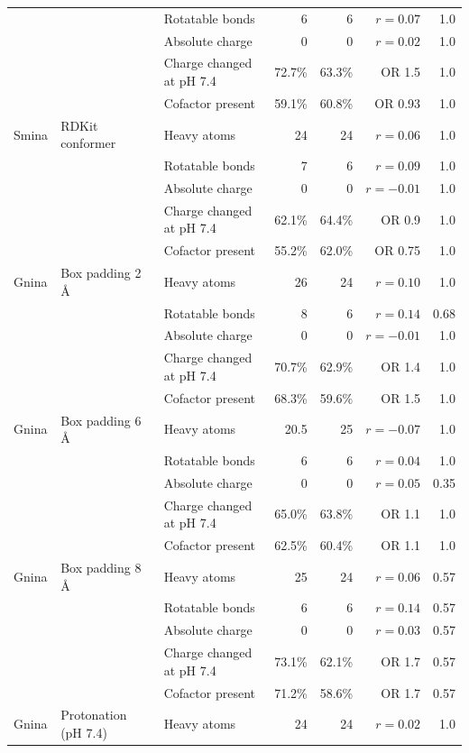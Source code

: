 \begin{longtable}{lllrrrr}
 &  & Rotatable bonds & 6 & 6 & $r = 0.07$ & 1.0 \\
 &  & Absolute charge & 0 & 0 & $r = 0.02$ & 1.0 \\
 &  & Charge changed at pH 7.4 & 72.7\% & 63.3\% & OR 1.5 & 1.0 \\
 &  & Cofactor present & 59.1\% & 60.8\% & OR 0.93 & 1.0 \\
\addlinespace
Smina & RDKit conformer & Heavy atoms & 24 & 24 & $r = 0.06$ & 1.0 \\
 &  & Rotatable bonds & 7 & 6 & $r = 0.09$ & 1.0 \\
 &  & Absolute charge & 0 & 0 & $r = -0.01$ & 1.0 \\
 &  & Charge changed at pH 7.4 & 62.1\% & 64.4\% & OR 0.9 & 1.0 \\
 &  & Cofactor present & 55.2\% & 62.0\% & OR 0.75 & 1.0 \\
\addlinespace
Gnina & Box padding 2 \AA{} & Heavy atoms & 26 & 24 & $r = 0.10$ & 1.0 \\
 &  & Rotatable bonds & 8 & 6 & $r = 0.14$ & 0.68 \\
 &  & Absolute charge & 0 & 0 & $r = -0.01$ & 1.0 \\
 &  & Charge changed at pH 7.4 & 70.7\% & 62.9\% & OR 1.4 & 1.0 \\
 &  & Cofactor present & 68.3\% & 59.6\% & OR 1.5 & 1.0 \\
\addlinespace
Gnina & Box padding 6 \AA{} & Heavy atoms & 20.5 & 25 & $r = -0.07$ & 1.0 \\
 &  & Rotatable bonds & 6 & 6 & $r = 0.04$ & 1.0 \\
 &  & Absolute charge & 0 & 0 & $r = 0.05$ & 0.35 \\
 &  & Charge changed at pH 7.4 & 65.0\% & 63.8\% & OR 1.1 & 1.0 \\
 &  & Cofactor present & 62.5\% & 60.4\% & OR 1.1 & 1.0 \\
\addlinespace
Gnina & Box padding 8 \AA{} & Heavy atoms & 25 & 24 & $r = 0.06$ & 0.57 \\
 &  & Rotatable bonds & 6 & 6 & $r = 0.14$ & 0.57 \\
 &  & Absolute charge & 0 & 0 & $r = 0.03$ & 0.57 \\
 &  & Charge changed at pH 7.4 & 73.1\% & 62.1\% & OR 1.7 & 0.57 \\
 &  & Cofactor present & 71.2\% & 58.6\% & OR 1.7 & 0.57 \\
\addlinespace
Gnina & Protonation (pH 7.4) & Heavy atoms & 24 & 24 & $r = 0.02$ & 1.0 \\

\end{longtable}
